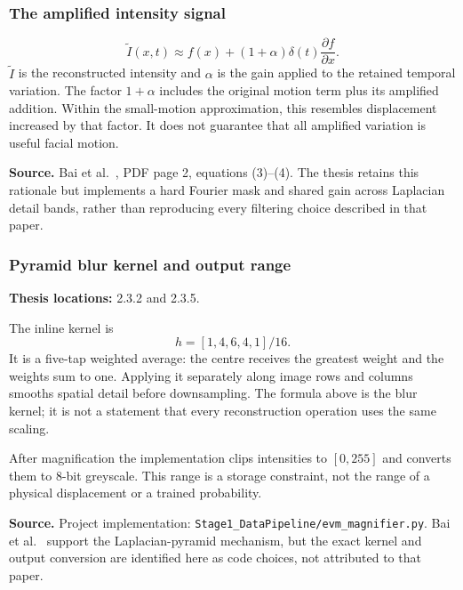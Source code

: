 \documentclass[11pt,a4paper]{article}
\numberwithin{equation}{section}
\begin{document}
\subsubsection{The amplified intensity signal}
\begin{equation}
    \widetilde I(x,t)\approx
       f(x)+(1+\alpha)\delta(t)\frac{\partial f}{\partial x}.
    \label{fg:eq:evm-gain}
\end{equation}
$\widetilde I$ is the reconstructed intensity and $\alpha$ is the gain applied
to the retained temporal variation. The factor $1+\alpha$ includes the original
motion term plus its amplified addition. Within the small-motion approximation,
this resembles displacement increased by that factor. It does not guarantee
that all amplified variation is useful facial motion.

\textbf{Source.} Bai et al.~\cite{bai2021}, PDF page 2, equations (3)--(4).
The thesis retains this rationale but implements a hard Fourier mask and shared
gain across Laplacian detail bands, rather than reproducing every filtering
choice described in that paper.

\subsubsection{Pyramid blur kernel and output range}
\label{fg:pyramid}
\textbf{Thesis locations:} 2.3.2 and 2.3.5.

The inline kernel is
\begin{equation}
    h=[1,4,6,4,1]/16.
    \label{fg:eq:blur}
\end{equation}
It is a five-tap weighted average: the centre receives the greatest weight and
the weights sum to one. Applying it separately along image rows and columns
smooths spatial detail before downsampling. The formula above is the blur
kernel; it is not a statement that every reconstruction operation uses the
same scaling.

\label{fg:clip}
After magnification the implementation clips intensities to $[0,255]$ and
converts them to 8-bit greyscale. This range is a storage constraint, not the
range of a physical displacement or a trained probability.

\textbf{Source.} Project implementation:
\texttt{Stage1\_DataPipeline/evm\_magnifier.py}. Bai et al.~\cite{bai2021}
support the Laplacian-pyramid mechanism, but the exact kernel and output
conversion are identified here as code choices, not attributed to that paper.
\end{document}
